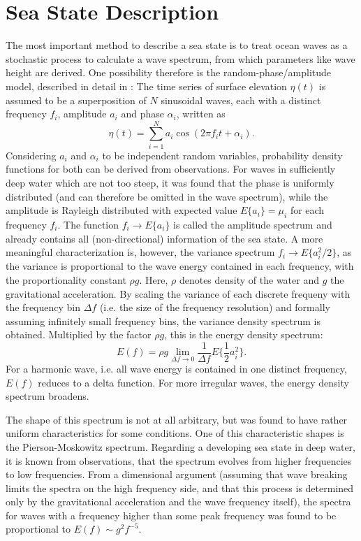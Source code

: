 \section{Sea State Description}
The most important method 
to describe a sea state is to treat ocean waves as a stochastic process to 
calculate a wave spectrum, from which parameters like wave height are derived. 
One possibility therefore is the random-phase/amplitude model, described in 
detail in \cite{holthuijsen2007}: The time series of surface elevation $ \eta 
(t)$ is assumed to be a superposition of $N$ sinusoidal waves, each with a 
distinct frequency $f_i$, amplitude $a_i$ and phase $\alpha_i$, written as
\begin{equation}
 \label{sinussum}
 \eta(t) = \sum_{i=1}^N a_i \cos (2\pi f_i t + \alpha_i).
\end{equation}
Considering $a_i$ and $\alpha_i$ to be independent random variables, 
probability density functions for both can be derived from observations. For 
waves in sufficiently deep water which are not too steep, it was found that the 
phase is uniformly distributed (and can therefore be omitted in the wave 
spectrum), while the amplitude is Rayleigh distributed with expected value 
$E\{a_i\} = \mu_i$ for each frequency $f_i$. The function $f_i \rightarrow 
E\{a_i\}$ is called the amplitude spectrum and already contains all 
(non-directional) information of the sea state. A more meaningful 
characterization is, however, the variance spectrum $f_i \rightarrow E\{a_i^2 
\slash 2\}$, as the variance is proportional to the wave energy contained in 
each frequency, with the proportionality constant $\rho g$. Here, $\rho$ denotes 
density of the water and $g$ the gravitational acceleration. By scaling the 
variance of each discrete frequeny with the frequency bin $\Delta f$ (i.e. the 
size of the frequency resolution) and formally assuming infinitely small 
frequency bins, the variance density spectrum is obtained. Multiplied by the 
factor $\rho g$, this is the energy density spectrum:
\begin{equation}
 \label{vardensspec}
 E(f) = \rho g \lim_{\Delta f \rightarrow 0} \frac{1}{\Delta f} E\{\frac{1}{2} 
a_i^2\}.
\end{equation}
For a harmonic wave, i.e. all wave energy is contained in one distinct 
frequency, $E(f)$ reduces to a delta function. For more irregular waves, the 
energy density spectrum broadens. 

The shape of this spectrum is not at all arbitrary, but was found to have 
rather uniform characteristics for some conditions. One of this 
characteristic shapes is the Pierson-Moskowitz spectrum. Regarding a developing 
sea state in deep water, it is known from observations, that the spectrum 
evolves from higher frequencies to low frequencies. From a dimensional argument 
(assuming that wave breaking limits the spectra on the high frequency side, and 
that this process is determined only by the gravitational acceleration and the 
wave frequency itself), the spectra for waves with a frequency higher than some 
peak frequency was found to be proportional to $E(f) \sim g^2f^{-5}$.

